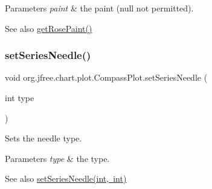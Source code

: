 \begin{DoxyParams}{Parameters}
{\em paint} & the paint ({\ttfamily null} not permitted).\\
\hline
\end{DoxyParams}
\begin{DoxySeeAlso}{See also}
\mbox{\hyperlink{classorg_1_1jfree_1_1chart_1_1plot_1_1_compass_plot_ad70a4293a0a4a9998726fbcb110c581d}{get\+Rose\+Paint()}} 
\end{DoxySeeAlso}
\mbox{\label{classorg_1_1jfree_1_1chart_1_1plot_1_1_compass_plot_a6fae0892abeec874e3c75de69f6d1b13}} 
\subsubsection{\texorpdfstring{set\+Series\+Needle()}{setSeriesNeedle()}\hspace{0.1cm}{\footnotesize\ttfamily [1/3]}}
{\footnotesize\ttfamily void org.\+jfree.\+chart.\+plot.\+Compass\+Plot.\+set\+Series\+Needle (\begin{DoxyParamCaption}\item[{int}]{type }\end{DoxyParamCaption})}

Sets the needle type.


\begin{DoxyParams}{Parameters}
{\em type} & the type.\\
\hline
\end{DoxyParams}
\begin{DoxySeeAlso}{See also}
\mbox{\hyperlink{classorg_1_1jfree_1_1chart_1_1plot_1_1_compass_plot_afa5a17dbb86f1f9673b37fa3df8b4403}{set\+Series\+Needle(int, int)}} 
\end{DoxySeeAlso}
\mbox{\label{classorg_1_1jfree_1_1chart_1_1plot_1_1_compass_plot_afa5a17dbb86f1f9673b37fa3df8b4403}} 
